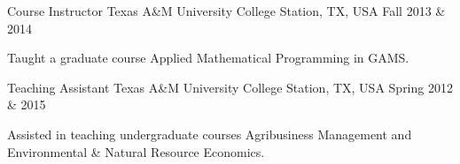 \begin{cventries}
    \cventry
    {Course Instructor} %
    {Texas A\&M University} %
    {College Station, TX, USA} %
    {Fall 2013 \& 2014} %
    {
        \begin{cvitems} %
            \item {Taught a graduate course Applied Mathematical Programming in GAMS.}
        \end{cvitems}
    }

    \cventry
    {Teaching Assistant} %
    {Texas A\&M University} %
    {College Station, TX, USA} %
    {Spring 2012 \& 2015} %
    {
        \begin{cvitems} %
            \item {Assisted in teaching undergraduate courses Agribusiness Management and Environmental \& Natural Resource Economics.}
        \end{cvitems}
    }

\end{cventries}
